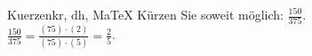 \begin{MAufgabe}{Kuerzen}{kr, dh, MaTeX}
K\"urzen Sie soweit m\"oglich: $\frac{150}{375}$.\\ 
\ifLsg\MLoesung
\quad $\frac{150}{375}=\frac{(75)\cdot(2)}{(75)\cdot(5)}=\frac{2}{5}$.\else\relax\fi
 \end{MAufgabe}